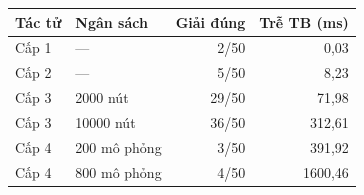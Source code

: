 \begin{tabular}{l l r r}
\toprule
Tác tử & Ngân sách & Giải đúng & Trễ TB (ms) \\
\midrule
Cấp 1 & ---  & 2/50 & 0,03 \\
Cấp 2 & ---  & 5/50 & 8,23 \\
Cấp 3 & 2000 nút & 29/50 & 71,98 \\
Cấp 3 & 10000 nút & 36/50 & 312,61 \\
Cấp 4 & 200 mô phỏng & 3/50 & 391,92 \\
Cấp 4 & 800 mô phỏng & 4/50 & 1600,46 \\
\bottomrule
\end{tabular}
